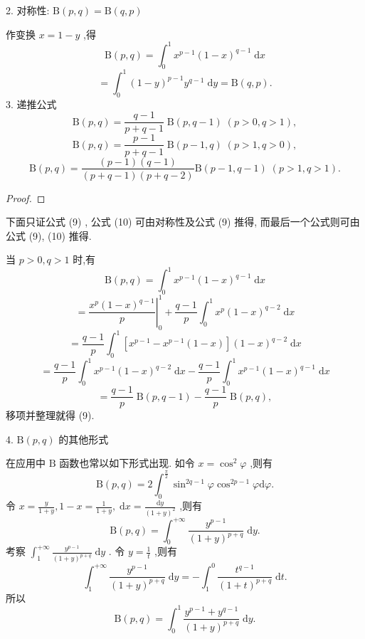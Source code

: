 2. 对称性: \(\mathrm{B}\left( {p,q}\right)  = \mathrm{B}\left( {q,p}\right)\)

作变换 \(x = 1 - y\) ,得
\[
\mathrm{B}\left( {p,q}\right)  = {\int }_{0}^{1}{x}^{p - 1}{\left( 1 - x\right) }^{q - 1}\mathrm{\;d}x
\]
\[
= {\int }_{0}^{1}{\left( 1 - y\right) }^{p - 1}{y}^{q - 1}\mathrm{\;d}y = \mathrm{B}\left( {q,p}\right) .
\]
3. 递推公式
\[
\mathrm{B}\left( {p,q}\right)  = \frac{q - 1}{p + q - 1}\mathrm{\;B}\left( {p,q - 1}\right) \;\left( {p > 0,q > 1}\right) , \tag{9}
\]
\[
\mathrm{B}\left( {p,q}\right)  = \frac{p - 1}{p + q - 1}\mathrm{\;B}\left( {p - 1,q}\right) \;\left( {p > 1,q > 0}\right) , \tag{10}
\]
\[
\mathrm{B}\left( {p,q}\right)  = \frac{\left( {p - 1}\right) \left( {q - 1}\right) }{\left( {p + q - 1}\right) \left( {p + q - 2}\right) }\mathrm{B}\left( {p - 1,q - 1}\right) \;\left( {p > 1,q > 1}\right) .
\]
\begin{proof}

\end{proof}
下面只证公式 (9) , 公式 (10) 可由对称性及公式 (9) 推得, 而最后一个公式则可由公式 (9), (10) 推得.

当 \(p > 0,q > 1\) 时,有
\[
\mathrm{B}\left( {p,q}\right)  = {\int }_{0}^{1}{x}^{p - 1}{\left( 1 - x\right) }^{q - 1}\mathrm{\;d}x
\]
\[
= {\left. \frac{{x}^{p}{\left( 1 - x\right) }^{q - 1}}{p}\right| }_{0}^{1} + \frac{q - 1}{p}{\int }_{0}^{1}{x}^{p}{\left( 1 - x\right) }^{q - 2}\mathrm{\;d}x
\]
\[
= \frac{q - 1}{p}{\int }_{0}^{1}\left\lbrack  {{x}^{p - 1} - {x}^{p - 1}\left( {1 - x}\right) }\right\rbrack  {\left( 1 - x\right) }^{q - 2}\mathrm{\;d}x
\]
\[
= \frac{q - 1}{p}{\int }_{0}^{1}{x}^{p - 1}{\left( 1 - x\right) }^{q - 2}\mathrm{\;d}x - \frac{q - 1}{p}{\int }_{0}^{1}{x}^{p - 1}{\left( 1 - x\right) }^{q - 1}\mathrm{\;d}x
\]
\[
= \frac{q - 1}{p}\mathrm{\;B}\left( {p,q - 1}\right)  - \frac{q - 1}{p}\mathrm{\;B}\left( {p,q}\right) ,
\]
移项并整理就得 (9).

4. \(\mathrm{B}\left( {p,q}\right)\) 的其他形式

在应用中 \(\mathrm{B}\) 函数也常以如下形式出现. 如令 \(x = {\cos }^{2}\varphi\) ,则有
\[
\mathrm{B}\left( {p,q}\right)  = 2{\int }_{0}^{\frac{\pi }{2}}{\sin }^{{2q} - 1}\varphi {\cos }^{{2p} - 1}\varphi \mathrm{d}\varphi . \tag{11}
\]
令 \(x = \frac{y}{1 + y},1 - x = \frac{1}{1 + y},\mathrm{\;d}x = \frac{\mathrm{d}y}{{\left( 1 + y\right) }^{2}}\) ,则有
\[
\mathrm{B}\left( {p,q}\right)  = {\int }_{0}^{+\infty }\frac{{y}^{p - 1}}{{\left( 1 + y\right) }^{p + q}}\mathrm{\;d}y.
\]
考察 \({\int }_{1}^{+\infty }\frac{{y}^{p - 1}}{{\left( 1 + y\right) }^{p + q}}\mathrm{\;d}y\) . 令 \(y = \frac{1}{t}\) ,则有
\[
{\int }_{1}^{+\infty }\frac{{y}^{p - 1}}{{\left( 1 + y\right) }^{p + q}}\mathrm{\;d}y =  - {\int }_{1}^{0}\frac{{t}^{q - 1}}{{\left( 1 + t\right) }^{p + q}}\mathrm{\;d}t.
\]
所以
\[
\mathrm{B}\left( {p,q}\right)  = {\int }_{0}^{1}\frac{{y}^{p - 1} + {y}^{q - 1}}{{\left( 1 + y\right) }^{p + q}}\mathrm{\;d}y.
\]

